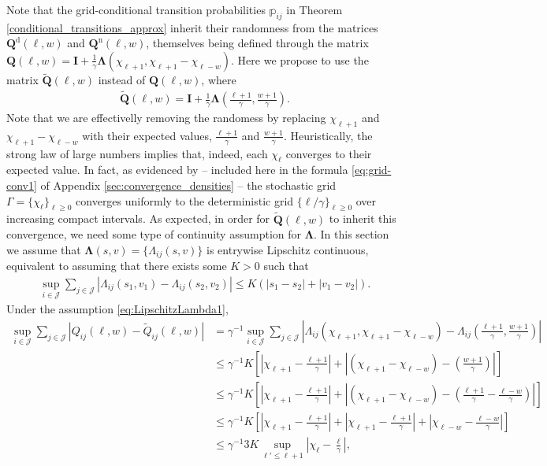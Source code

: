 \documentclass[11pt,leqno]{amsart}
\numberwithin{table}{section}
\numberwithin{figure}{section}
\numberwithin{equation}{section}
\newcommand{\1}{{\mathds{1}}}
\newcommand{\0}{\mat{0}}
\newcommand{\ap}[1]{\mathbb{#1}}
\newcommand{\tld}[1]{\widetilde{#1}}
\begin{document}
Note that the grid-conditional transition probabilities $\ap{p}_{ij}$ in Theorem \ref{conditional_transitions_approx} inherit their randomness from the matrices $\bm{Q}^{\mathrm{d}}(\ell,w)$ and $\bm{Q}^{\mathrm{n}}(\ell,w)$, themselves being defined through the matrix $\bm{Q}(\ell,w)=\bm{I} + \tfrac{1}{\gamma}\bm{\Lambda}(\chi_{\ell+1}, \chi_{\ell+1}-\chi_{\ell-w})$. Here we propose to use the matrix $\tld{\bm{Q}}(\ell,w)$ instead of $\bm{Q}(\ell,w)$, where
\begin{align}\tld{\bm{Q}}(\ell,w) = \bm{I} + \tfrac{1}{\gamma}\bm{\Lambda}\left(\tfrac{\ell+1}{\gamma}, \tfrac{w+1}{\gamma}\right).
\end{align}
Note that we are effectivelly removing the randomess by replacing $\chi_{\ell+1}$ and $\chi_{\ell+1}-\chi_{\ell-w}$ with their expected values, $\tfrac{\ell+1}{\gamma}$ and $\frac{w+1}{\gamma}$. Heuristically, the strong law of large numbers implies that, indeed, each $\chi_\ell$ converges to their expected value. In fact, as evidenced by \cite[Lemma 1, Eq (17)]{bladt_peralta} -- included here in the formula \eqref{eq:grid-conv1} of Appendix \ref{sec:convergence_densities} -- the stochastic grid $\Gamma=\{\chi_\ell\}_{\ell\ge 0}$ converges uniformly to the deterministic grid $\{\ell/\gamma\}_{\ell\ge 0}$ over increasing compact intervals. As expected, in order for $\tld{\bm{Q}}(\ell, w)$ to inherit this convergence, we need some type of continuity assumption for $\bm{\Lambda}$. In this section we assume that $\bm{\Lambda}(s,v)=\{\Lambda_{ij}(s,v)\}$ is entrywise Lipschitz continuous, { equivalent to assuming that} there exists some $K>0$ such that
{
\begin{align}
\sup_{i\in\mathcal{J}}\sum_{j\in\mathcal{J}}\left| \Lambda_{ij}(s_1,v_1) - \Lambda_{ij}(s_2,v_2)\right|\le K\left(|s_1-s_2| + |v_1-v_2|\right).\label{eq:LipschitzLambda1}
\end{align}
}
Under the assumption \eqref{eq:LipschitzLambda1},
{
\begin{align}
\sup_{i\in\mathcal{J}}\sum_{j\in\mathcal{J}} \left|Q_{ij}(\ell, w)-\tld{Q}_{ij}(\ell, w)\right|& =\gamma^{-1}\sup_{i\in\mathcal{J}}\sum_{j\in\mathcal{J}}\left|\Lambda_{ij}(\chi_{\ell+1}, \chi_{\ell+1}-\chi_{\ell-w})-\Lambda_{ij}\left(\tfrac{\ell+1}{\gamma}, \tfrac{w+1}{\gamma}\right)\right|\nonumber\\
& \le \gamma^{-1} K \left[\left|\chi_{\ell+1}-\tfrac{\ell+1}{\gamma}\right| + \left|\left(\chi_{\ell+1}-\chi_{\ell-w}\right) - \left(\tfrac{w+1}{\gamma}\right)\right|\right]\nonumber\\
& \le \gamma^{-1} K \left[\left|\chi_{\ell+1}-\tfrac{\ell+1}{\gamma}\right| + \left|\left(\chi_{\ell+1}-\chi_{\ell-w}\right) - \left(\tfrac{\ell+1}{\gamma} - \tfrac{\ell-w}{\gamma}\right)\right|\right]\nonumber\\
& \le \gamma^{-1} K \left[\left|\chi_{\ell+1}-\tfrac{\ell+1}{\gamma}\right| + \left|\chi_{\ell+1}-\tfrac{\ell+1}{\gamma}\right| + \left|\chi_{\ell-w} -  \tfrac{\ell-w}{\gamma}\right|\right]\nonumber\\
&\le \gamma^{-1}3K\sup_{\ell'\le \ell+1}\left|\chi_{\ell}-\tfrac{\ell}{\gamma}\right|,\label{eq:Qbound7}
\end{align}
}
\end{document}
